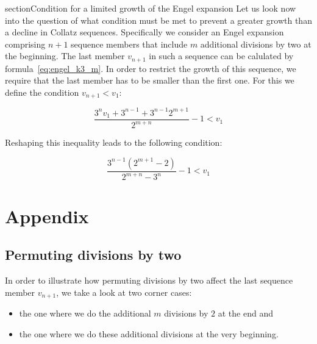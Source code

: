 \documentclass[12pt]{amsart}
\theoremstyle{definition}
\begin{document}

section{Condition for a limited growth of the Engel expansion}
\label{sec:condition_limited_growth}
Let us look now into the question of what condition must be met to prevent a greater growth than a decline in Collatz sequences. Specifically we consider an Engel expansion comprising $n+1$ sequence members that include $m$ additional divisions by two at the beginning. The last member $v_{n+1}$ in such a sequence can be calulated by formula~\ref{eq:engel_k3_m}. In order to restrict the growth of this sequence, we require that the last member has to be smaller than the first one. For this we define the condition $v_{n+1}<v_1$:

\[
\frac{3^nv_1+3^{n-1}+3^{n-1}2^{m+1}}{2^{m+n}}-1<v_1
\]

\par\medskip\noindent
Reshaping this inequality leads to the following condition:

\begin{equation}
\label{eq:condition_limited_growth}
\frac{3^{n-1}\left(2^{m+1}-2\right)}{2^{m+n}-3^n}-1<v_1
\end{equation}

\newpage
\section{Appendix}

\subsection{Permuting divisions by two}
\label{appx:permuting_divisions}
In order to illustrate how permuting divisions by two affect the last sequence member $v_{n+1}$, we take a look at two corner cases:
\begin{itemize}
	\item the one where we do the additional $m$ divisions by $2$ at the end and
	\item the one where we do these additional divisions at the very beginning.
\end{itemize}
\end{document}

